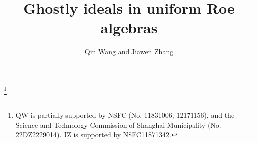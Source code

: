 \documentclass[12pt, a4paper]{amsart}
\numberwithin{equation}{section}
\theoremstyle{definition}
\theoremstyle{remark}
\begin{document}
\title{Ghostly ideals in uniform Roe algebras}

\author{Qin Wang and Jiawen Zhang}



\address[Q. Wang]{Research Center for Operator Algebras, and Shanghai Key Laboratory of Pure Mathematics and Mathematical Practice, School of Mathematical Sciences, East China Normal University, Shanghai, 200241, China.}


\address[J. Zhang]{School of Mathematical Sciences, Fudan University, 220 Handan Road, Shanghai, 200433, China.}


\date{}


\thanks{QW is partially supported by NSFC (No. 11831006, 12171156), and the Science and Technology Commission of Shanghai Municipality (No. 22DZ2229014). JZ is supported by NSFC11871342. }
\end{document}
